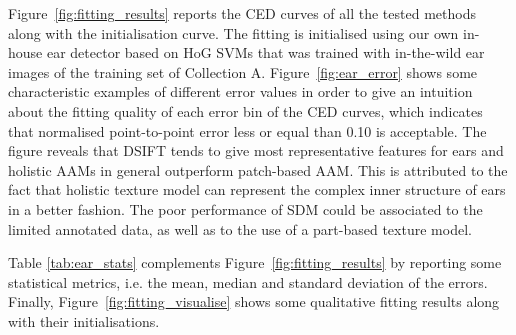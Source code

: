Figure~\ref{fig:fitting_results} reports the CED curves of all the tested methods along with the initialisation curve. The fitting is initialised using our own in-house ear detector based on HoG SVMs that was trained with in-the-wild ear images of the training set of Collection A. Figure~\ref{fig:ear_error} shows some characteristic examples of different error values in order to give an intuition about the fitting quality of each error bin of the CED curves, which indicates that normalised point-to-point error less or equal than 0.10 is acceptable. The figure reveals that DSIFT tends to give most representative features for ears and holistic AAMs in general outperform patch-based AAM. This is attributed to the fact that holistic texture model can represent the complex inner structure of ears in a better fashion. The poor performance of SDM could be associated to the limited annotated data, as well as to the use of a part-based texture model. 


Table \ref{tab:ear_stats} complements Figure~\ref{fig:fitting_results} by reporting some statistical metrics, i.e. the mean, median and standard deviation of the errors. Finally, Figure~\ref{fig:fitting_visualise} shows some qualitative fitting results along with their initialisations.





